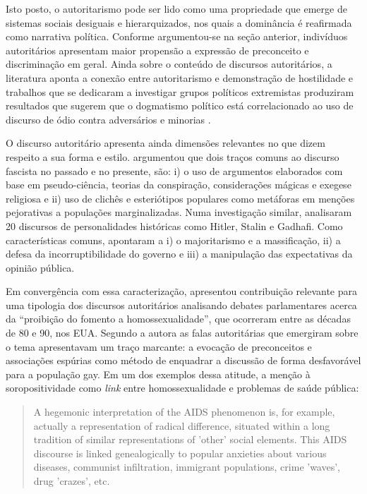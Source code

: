 \documentclass[
12pt,				%
openright,			%
twoside,			%
a4paper,			%
english,			%
french,				%
spanish,			%
brazil				%
]{abntex2}
\begin{document}
Isto posto, o autoritarismo pode ser lido como uma propriedade que emerge de sistemas sociais desiguais e hierarquizados, nos quais a dominância é reafirmada como narrativa política. Conforme argumentou-se na seção anterior, indivíduos autoritários apresentam maior propensão a expressão de preconceito e discriminação em geral. Ainda sobre o conteúdo de discursos autoritários, a literatura aponta a conexão entre autoritarismo e demonstração de hostilidade \cite{siegel1956relationship} e trabalhos que se dedicaram a investigar grupos políticos extremistas produziram resultados que sugerem que o dogmatismo político está correlacionado ao uso de discurso de ódio contra adversários e minorias \cite{gerstenfeld2003hate, ben2016hate}.  

O discurso autoritário apresenta ainda dimensões relevantes no que dizem respeito a sua forma e estilo.  argumentou que dois traços comuns ao discurso fascista no passado e no presente, são: i) o uso de argumentos elaborados com base em pseudo-ciência, teorias da conspiração, considerações mágicas e exegese religiosa e ii) uso de clichês e esteriótipos populares como metáforas em menções pejorativas a populações marginalizadas. Numa investigação similar,  analisaram 20 discursos de personalidades históricas como Hitler, Stalin e Gadhafi. Como características comuns, apontaram a i) o majoritarismo e a massificação, ii) a defesa da incorruptibilidade do governo e iii) a manipulação das expectativas da opinião pública.

Em convergência com essa caracterização,  apresentou contribuição relevante para uma tipologia dos discursos autoritários analisando debates parlamentares acerca da ``proibição do fomento a homossexualidade'', que ocorreram entre as décadas de 80 e 90, nos EUA. Segundo a autora as falas autoritárias que emergiram sobre o tema apresentavam um traço marcante: a evocação de preconceitos e associações espúrias como método de enquadrar a discussão de forma desfavorável para a população gay. Em um dos exemplos dessa atitude, a menção à soropositividade como \emph{link} entre homossexualidade e problemas de saúde pública:

\begin{quote}
	A hegemonic interpretation of the AIDS phenomenon is, for example, actually a representation of radical difference, situated within a long tradition of similar representations of 'other' social elements. This AIDS discourse is linked genealogically to popular anxieties about various diseases, communist infiltration, immigrant populations, crime 'waves', drug 'crazes', etc. \cite{smith2015advances}
\end{quote}
\end{document}
